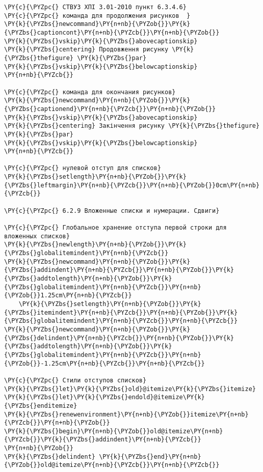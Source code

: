 \begin{Verbatim}[commandchars=\\\{\}]
\PY{c}{\PYZpc{} СТВУЗ ХПІ 3.01-2010 пункт 6.3.4.6}
\PY{c}{\PYZpc{} команда для продолжения рисунков  }
\PY{k}{\PYZbs{}newcommand}\PY{n+nb}{\PYZob{}}\PY{k}{\PYZbs{}captioncont}\PY{n+nb}{\PYZcb{}}\PY{n+nb}{\PYZob{}}
\PY{k}{\PYZbs{}vskip}\PY{k}{\PYZbs{}abovecaptionskip}
\PY{k}{\PYZbs{}centering} Продовження рисунку \PY{k}{\PYZbs{}thefigure} \PY{k}{\PYZbs{}par}
\PY{k}{\PYZbs{}vskip}\PY{k}{\PYZbs{}belowcaptionskip}
\PY{n+nb}{\PYZcb{}}

\PY{c}{\PYZpc{} команда для окончания рисунков}
\PY{k}{\PYZbs{}newcommand}\PY{n+nb}{\PYZob{}}\PY{k}{\PYZbs{}captionend}\PY{n+nb}{\PYZcb{}}\PY{n+nb}{\PYZob{}}
\PY{k}{\PYZbs{}vskip}\PY{k}{\PYZbs{}abovecaptionskip}
\PY{k}{\PYZbs{}centering} Закінчення рисунку \PY{k}{\PYZbs{}thefigure} \PY{k}{\PYZbs{}par}
\PY{k}{\PYZbs{}vskip}\PY{k}{\PYZbs{}belowcaptionskip}
\PY{n+nb}{\PYZcb{}}

\PY{c}{\PYZpc{} нулевой отступ для списков}
\PY{k}{\PYZbs{}setlength}\PY{n+nb}{\PYZob{}}\PY{k}{\PYZbs{}leftmargin}\PY{n+nb}{\PYZcb{}}\PY{n+nb}{\PYZob{}}0cm\PY{n+nb}{\PYZcb{}}

\PY{c}{\PYZpc{} 6.2.9 Вложенные списки и нумерации. Сдвиги}

\PY{c}{\PYZpc{} Глобальное хранение отступа первой строки для вложенных списков}
\PY{k}{\PYZbs{}newlength}\PY{n+nb}{\PYZob{}}\PY{k}{\PYZbs{}globalitemindent}\PY{n+nb}{\PYZcb{}}
\PY{k}{\PYZbs{}newcommand}\PY{n+nb}{\PYZob{}}\PY{k}{\PYZbs{}addindent}\PY{n+nb}{\PYZcb{}}\PY{n+nb}{\PYZob{}}\PY{k}{\PYZbs{}addtolength}\PY{n+nb}{\PYZob{}}\PY{k}{\PYZbs{}globalitemindent}\PY{n+nb}{\PYZcb{}}\PY{n+nb}{\PYZob{}}1.25cm\PY{n+nb}{\PYZcb{}}
    \PY{k}{\PYZbs{}setlength}\PY{n+nb}{\PYZob{}}\PY{k}{\PYZbs{}itemindent}\PY{n+nb}{\PYZcb{}}\PY{n+nb}{\PYZob{}}\PY{k}{\PYZbs{}globalitemindent}\PY{n+nb}{\PYZcb{}}\PY{n+nb}{\PYZcb{}}
\PY{k}{\PYZbs{}newcommand}\PY{n+nb}{\PYZob{}}\PY{k}{\PYZbs{}delindent}\PY{n+nb}{\PYZcb{}}\PY{n+nb}{\PYZob{}}\PY{k}{\PYZbs{}addtolength}\PY{n+nb}{\PYZob{}}\PY{k}{\PYZbs{}globalitemindent}\PY{n+nb}{\PYZcb{}}\PY{n+nb}{\PYZob{}}-1.25cm\PY{n+nb}{\PYZcb{}}\PY{n+nb}{\PYZcb{}}

\PY{c}{\PYZpc{} Стили отступов списков}
\PY{k}{\PYZbs{}let}\PY{k}{\PYZbs{}old}@itemize\PY{k}{\PYZbs{}itemize}
\PY{k}{\PYZbs{}let}\PY{k}{\PYZbs{}endold}@itemize\PY{k}{\PYZbs{}enditemize}
\PY{k}{\PYZbs{}renewenvironment}\PY{n+nb}{\PYZob{}}itemize\PY{n+nb}{\PYZcb{}}\PY{n+nb}{\PYZob{}}
\PY{k}{\PYZbs{}begin}\PY{n+nb}{\PYZob{}}old@itemize\PY{n+nb}{\PYZcb{}}\PY{k}{\PYZbs{}addindent}\PY{n+nb}{\PYZcb{}}
\PY{n+nb}{\PYZob{}}
\PY{k}{\PYZbs{}delindent} \PY{k}{\PYZbs{}end}\PY{n+nb}{\PYZob{}}old@itemize\PY{n+nb}{\PYZcb{}}\PY{n+nb}{\PYZcb{}}


\end{Verbatim}
